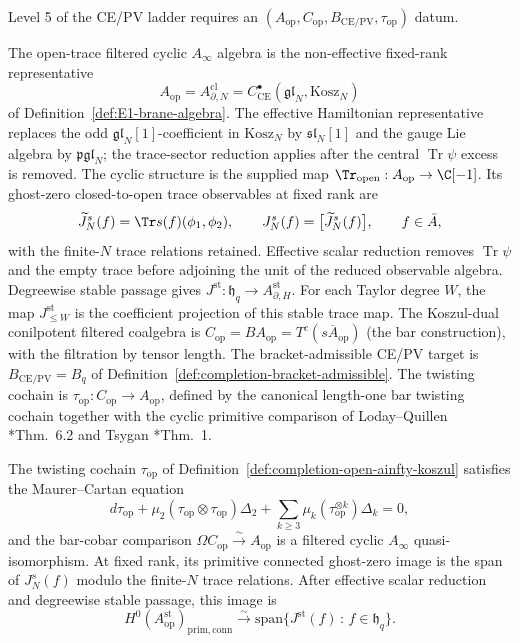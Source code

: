 Level 5 of the CE/PV ladder requires an
\((A_{\mathrm{op}},C_{\mathrm{op}},B_{\mathrm{CE/PV}},\tau_{\mathrm{op}})\)
datum.

\begin{defn}
\label{def:completion-open-ainfty-koszul}
The open-trace filtered cyclic \(A_\infty\) algebra is the
non-effective fixed-rank representative
\[
  A_{\mathrm{op}}=A^{\mathrm{cl}}_{\partial,N}
  =
  C^\bullet_{\mathrm{CE}}(\mathfrak{gl}_N,\mathrm{Kosz}_N)
\]
of Definition~\ref{def:E1-brane-algebra}.  The effective Hamiltonian
representative replaces the odd \(\mathfrak{gl}_N[1]\)-coefficient in
\(\mathrm{Kosz}_N\) by \(\mathfrak{sl}_N[1]\) and the gauge Lie algebra by
\(\mathfrak{pgl}_N\); the trace-sector reduction applies after the central
\(\operatorname{Tr}\psi\) excess is removed.  The cyclic structure is
the supplied map
\(\Tr_{\mathrm{open}}:A_{\mathrm{op}}\to\C[-1]\).  Its ghost-zero
closed-to-open trace observables at fixed rank are
\[
  \widetilde J_N^s(f)=\Tr s(f)(\phi_1,\phi_2),
  \qquad
  J_N^s(f)=\bigl[\widetilde J_N^s(f)\bigr],
  \qquad f\in\bar A,
\]
with the finite-\(N\) trace relations retained.  Effective scalar
reduction removes \(\operatorname{Tr}\psi\) and the empty trace before
adjoining the unit of the reduced observable algebra.  Degreewise
stable passage gives
\(J^{\mathrm{st}}\colon\mathfrak h_q\to
A_{\partial,H}^{\mathrm{st}}\).  For each Taylor degree \(W\), the
map \(J_{\leq W}^{\mathrm{st}}\) is the coefficient projection of
this stable trace map.  The Koszul-dual conilpotent filtered
coalgebra is
\(C_{\mathrm{op}}=BA_{\mathrm{op}}=
T^c(s\overline{A}_{\mathrm{op}})\) (the bar construction), with the
filtration by tensor length.  The bracket-admissible CE/PV target
is \(B_{\mathrm{CE/PV}}=B_q\) of
Definition~\ref{def:completion-bracket-admissible}.  The twisting
cochain is
\(\tau_{\mathrm{op}}:C_{\mathrm{op}}\to A_{\mathrm{op}}\), defined
by the canonical length-one bar twisting cochain together with the
cyclic primitive comparison of
Loday--Quillen \cite{loday-quillen}*{Thm.~6.2} and Tsygan
\cite{tsygan}*{Thm.~1}.
\end{defn}

\begin{thm}
\label{thm:completion-tau-op-mc}
The twisting cochain \(\tau_{\mathrm{op}}\) of
Definition~\ref{def:completion-open-ainfty-koszul} satisfies the
Maurer--Cartan equation
\[
  d\tau_{\mathrm{op}}
  +\mu_2(\tau_{\mathrm{op}}\otimes\tau_{\mathrm{op}})\Delta_2
  +\sum_{k\ge 3}\mu_k(\tau_{\mathrm{op}}^{\otimes k})\Delta_k=0,
\]
and the bar-cobar comparison
\(\Omega C_{\mathrm{op}}\xrightarrow{\sim}A_{\mathrm{op}}\) is a
filtered cyclic \(A_\infty\) quasi-isomorphism.  At fixed rank, its
primitive connected ghost-zero image is the span of \(J_N^s(f)\)
modulo the finite-\(N\) trace relations.  After effective scalar
reduction and degreewise stable passage, this image is
\[
  H^0(A_{\mathrm{op}}^{\mathrm{st}})_{\mathrm{prim,conn}}
  \xrightarrow{\sim}
  \mathrm{span}\{J^{\mathrm{st}}(f)\,:\,
    f\in\mathfrak h_q\}.
\]
\end{thm}

